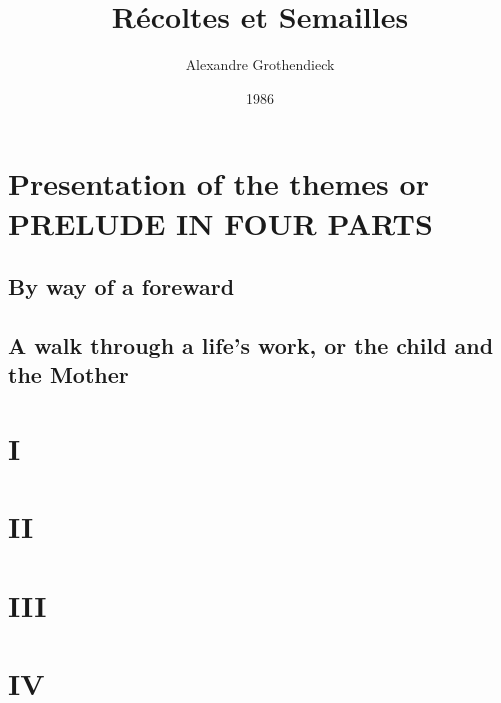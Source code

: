 \documentclass{book}
\begin{document}
\title{R\'ecoltes et Semailles}
\author{Alexandre Grothendieck}
\date{1986}
\maketitle
\tableofcontents

\part*{Presentation of the themes or PRELUDE IN FOUR PARTS}

\chapter{By way of a foreward}


\chapter{A walk through a life's work, or the child and the Mother}


\part{I}

\part{II}
\label{part:II}

\part{III}

\part{IV}
\label{part:IV}
\end{document}
